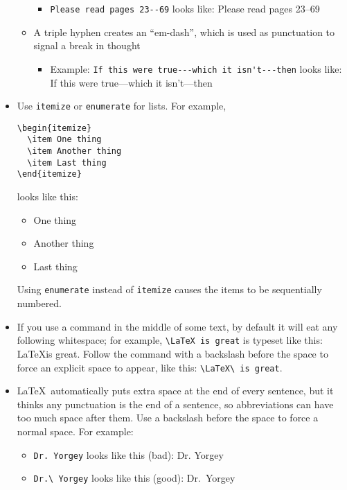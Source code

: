 \documentclass{article}
\begin{document}
\begin{itemize}
\begin{itemize}
\begin{itemize}
    \item \verb|Please read pages 23--69| looks like: Please read
      pages 23--69
    \end{itemize}
  \item A triple hyphen creates an ``em-dash'', which is used as
    punctuation to signal a break in thought
    \begin{itemize}
    \item Example: \verb|If this were true---which it isn't---then|
      looks like: If this were true---which it isn't---then
    \end{itemize}
  \end{itemize}
\item Use \verb|itemize| or \verb|enumerate| for lists. For example,
\begin{verbatim}
\begin{itemize}
  \item One thing
  \item Another thing
  \item Last thing
\end{itemize}
\end{verbatim}
  looks like this:

  \begin{itemize}
  \item One thing
  \item Another thing
  \item Last thing
  \end{itemize}

  Using \verb|enumerate| instead of \verb|itemize| causes the items to
  be sequentially numbered.

\item If you use a command in the middle of some text, by default it
  will eat any following whitespace; for example,%
  \verb|\LaTeX is great| is typeset like this: \LaTeX is great.
  Follow the command with a backslash before the space to force an
  explicit space to appear, like this: \verb|\LaTeX\ is great|.
\item \LaTeX\ automatically puts extra space at the end of every
  sentence, but it thinks any punctuation is the end of a sentence, so
  abbreviations can have too much space after them.  Use a backslash
  before the space to force a normal space.  For example:
  \begin{itemize}
  \item \verb|Dr. Yorgey| looks like this (bad): Dr. Yorgey
  \item \verb|Dr.\ Yorgey| looks like this (good): Dr.\ Yorgey
  \end{itemize}
\end{itemize}
\end{document}
